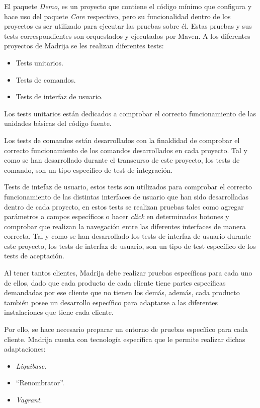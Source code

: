 \newpage

El paquete \textit{Demo}, es un proyecto que contiene el código mínimo que configura y hace uso del paquete \textit{Core} respectivo, pero su funcionalidad dentro de los proyectos es ser utilizado para ejecutar las pruebas sobre él. Estas pruebas y sus tests correspondientes son orquestados y ejecutados por Maven\cite{Maven}. A los diferentes proyectos de \ac{Madrija} se les realizan diferentes tests:
\begin{itemize}
	\item Tests unitarios.
	\item Tests de comandos.
	\item Tests de interfaz de usuario.
\end{itemize}

Los tests unitarios están dedicados a comprobar el correcto funcionamiento de las unidades básicas del código fuente.

Los tests de comandos están desarrollados con la finaldidad de comprobar el correcto funcionamiento de los comandos desarrollados en cada proyecto. Tal y como se han desarrollado durante el transcurso de este proyecto, los tests de comando, son un tipo específico de test de integración.

Tests de intefaz de usuario, estos tests son utilizados para comprobar el correcto funcionamiento de las distintas interfaces de usuario que han sido desarrolladas dentro de cada proyecto, en estos tests se realizan pruebas tales como agregar parámetros a campos específicos o hacer \textit{click} en determinados botones y comprobar que realizan la navegación entre las diferentes interfaces de manera correcta. Tal y como se han desarrollado los tests de interfaz de usuario durante este proyecto, los tests de interfaz de usuario, son un tipo de test específico de los tests de aceptación.

Al tener tantos clientes, \ac{Madrija} debe realizar pruebas específicas para cada uno de ellos, dado que cada producto de cada cliente tiene partes específicas demandadas por ese cliente que no tienen los demás, además, cada producto también posee un desarrollo específico para adaptarse a las diferentes instalaciones que tiene cada cliente.

Por ello, se hace necesario preparar un entorno de pruebas específico para cada cliente. \ac{Madrija} cuenta con tecnología específica que le permite realizar dichas adaptaciones:
\begin{itemize}
	\item \textit{Liquibase}.
	\item ``Renombrator''.
	\item \textit{Vagrant}.
\end{itemize}


